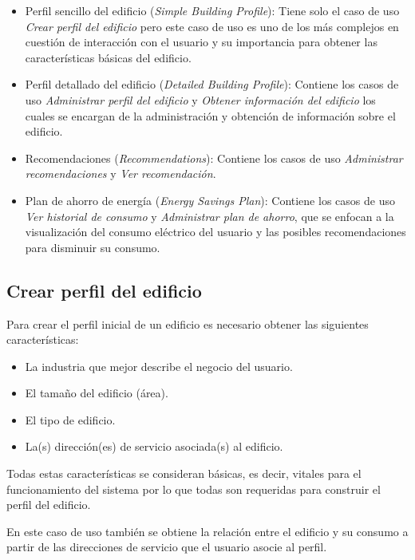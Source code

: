 \begin{itemize}
\item Perfil sencillo del edificio (\textit{Simple Building Profile}): Tiene
  solo el caso de uso \textit{Crear perfil del edificio} pero este caso de uso
  es uno de los más complejos en cuestión de interacción con el usuario y su
  importancia para obtener las características básicas del edificio.
\item Perfil detallado del edificio (\textit{Detailed Building Profile}): Contiene
  los casos de uso \textit{Administrar perfil del edificio} y
  \textit{Obtener información del edificio} los cuales se encargan de la
  administración y obtención de información sobre el edificio.
\item Recomendaciones (\textit{Recommendations}): Contiene los casos de uso
  \textit{Administrar recomendaciones} y \textit{Ver recomendación}.
\item Plan de ahorro de energía (\textit{Energy Savings Plan}): Contiene los
  casos de uso \textit{Ver historial de consumo} y \textit{Administrar plan de
    ahorro}, que se enfocan a la visualización del consumo eléctrico del usuario
  y las posibles recomendaciones para disminuir su consumo.
\end{itemize}


\subsection{Crear perfil del edificio}

Para crear el perfil inicial de un edificio es necesario obtener las siguientes
características:

\begin{itemize}
\item La industria que mejor describe el negocio del usuario.
\item El tamaño del edificio (área).
\item El tipo de edificio.
\item La(s) dirección(es) de servicio asociada(s) al edificio.
\end{itemize}

Todas estas características se consideran básicas, es decir, vitales para el
funcionamiento del sistema por lo que todas son requeridas para construir el perfil
del edificio.

En este caso de uso también se obtiene la relación entre el edificio y su consumo
a partir de las direcciones de servicio que el usuario asocie al perfil.

